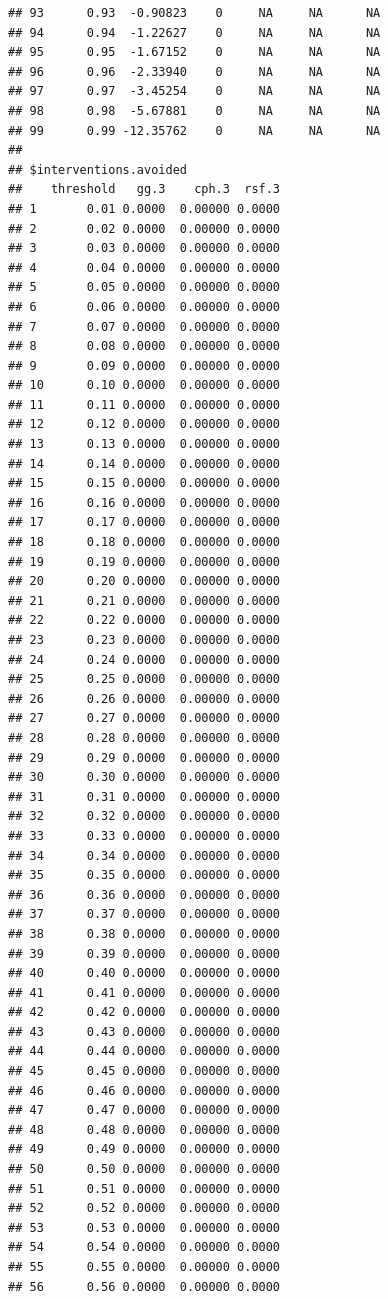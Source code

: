 \documentclass{article}\usepackage[]{graphicx}\usepackage[]{color}
\makeatletter
\newenvironment{kframe}{%
 \def\at@end@of@kframe{}%
 \ifinner\ifhmode%
  \def\at@end@of@kframe{\end{minipage}}%
  \begin{minipage}{\columnwidth}%
 \fi\fi%
 \def\FrameCommand##1{\hskip\@totalleftmargin \hskip-\fboxsep
 \colorbox{shadecolor}{##1}\hskip-\fboxsep
     \hskip-\linewidth \hskip-\@totalleftmargin \hskip\columnwidth}%
 \MakeFramed {\advance\hsize-\width
   \@totalleftmargin\z@ \linewidth\hsize
   \@setminipage}}%
 {\par\unskip\endMakeFramed%
 \at@end@of@kframe}
\newenvironment{knitrout}{}{} %
\makeatother
\begin{document}
\begin{knitrout}
\begin{kframe}
\begin{verbatim}
## 93      0.93  -0.90823    0     NA     NA      NA
## 94      0.94  -1.22627    0     NA     NA      NA
## 95      0.95  -1.67152    0     NA     NA      NA
## 96      0.96  -2.33940    0     NA     NA      NA
## 97      0.97  -3.45254    0     NA     NA      NA
## 98      0.98  -5.67881    0     NA     NA      NA
## 99      0.99 -12.35762    0     NA     NA      NA
## 
## $interventions.avoided
##    threshold   gg.3    cph.3  rsf.3
## 1       0.01 0.0000  0.00000 0.0000
## 2       0.02 0.0000  0.00000 0.0000
## 3       0.03 0.0000  0.00000 0.0000
## 4       0.04 0.0000  0.00000 0.0000
## 5       0.05 0.0000  0.00000 0.0000
## 6       0.06 0.0000  0.00000 0.0000
## 7       0.07 0.0000  0.00000 0.0000
## 8       0.08 0.0000  0.00000 0.0000
## 9       0.09 0.0000  0.00000 0.0000
## 10      0.10 0.0000  0.00000 0.0000
## 11      0.11 0.0000  0.00000 0.0000
## 12      0.12 0.0000  0.00000 0.0000
## 13      0.13 0.0000  0.00000 0.0000
## 14      0.14 0.0000  0.00000 0.0000
## 15      0.15 0.0000  0.00000 0.0000
## 16      0.16 0.0000  0.00000 0.0000
## 17      0.17 0.0000  0.00000 0.0000
## 18      0.18 0.0000  0.00000 0.0000
## 19      0.19 0.0000  0.00000 0.0000
## 20      0.20 0.0000  0.00000 0.0000
## 21      0.21 0.0000  0.00000 0.0000
## 22      0.22 0.0000  0.00000 0.0000
## 23      0.23 0.0000  0.00000 0.0000
## 24      0.24 0.0000  0.00000 0.0000
## 25      0.25 0.0000  0.00000 0.0000
## 26      0.26 0.0000  0.00000 0.0000
## 27      0.27 0.0000  0.00000 0.0000
## 28      0.28 0.0000  0.00000 0.0000
## 29      0.29 0.0000  0.00000 0.0000
## 30      0.30 0.0000  0.00000 0.0000
## 31      0.31 0.0000  0.00000 0.0000
## 32      0.32 0.0000  0.00000 0.0000
## 33      0.33 0.0000  0.00000 0.0000
## 34      0.34 0.0000  0.00000 0.0000
## 35      0.35 0.0000  0.00000 0.0000
## 36      0.36 0.0000  0.00000 0.0000
## 37      0.37 0.0000  0.00000 0.0000
## 38      0.38 0.0000  0.00000 0.0000
## 39      0.39 0.0000  0.00000 0.0000
## 40      0.40 0.0000  0.00000 0.0000
## 41      0.41 0.0000  0.00000 0.0000
## 42      0.42 0.0000  0.00000 0.0000
## 43      0.43 0.0000  0.00000 0.0000
## 44      0.44 0.0000  0.00000 0.0000
## 45      0.45 0.0000  0.00000 0.0000
## 46      0.46 0.0000  0.00000 0.0000
## 47      0.47 0.0000  0.00000 0.0000
## 48      0.48 0.0000  0.00000 0.0000
## 49      0.49 0.0000  0.00000 0.0000
## 50      0.50 0.0000  0.00000 0.0000
## 51      0.51 0.0000  0.00000 0.0000
## 52      0.52 0.0000  0.00000 0.0000
## 53      0.53 0.0000  0.00000 0.0000
## 54      0.54 0.0000  0.00000 0.0000
## 55      0.55 0.0000  0.00000 0.0000
## 56      0.56 0.0000  0.00000 0.0000

\end{verbatim}
\end{kframe}
\end{knitrout}
\end{document}
